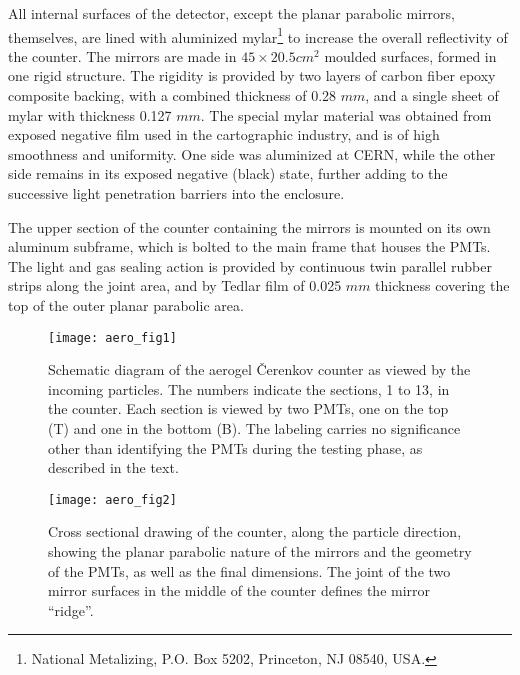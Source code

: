 All internal surfaces of the detector, except the planar parabolic mirrors,
themselves, are lined with aluminized 
mylar\footnote{National Metalizing, P.O. Box 5202, Princeton, NJ 08540, USA.} 
to increase the overall reflectivity of the counter.  
The mirrors are made in $45\times 20.5 cm^2$ moulded surfaces, formed in one 
rigid structure. 
The rigidity is provided by two layers of carbon fiber epoxy composite backing, 
with a combined thickness of 0.28 $mm$, and a single sheet of mylar with 
thickness 0.127 $mm$. 
The special mylar material was obtained from exposed negative film used in the
cartographic industry, and is of high smoothness and uniformity. One side was
aluminized at CERN, while the other side remains in its exposed negative
(black) state, further adding to the successive light penetration barriers into
the enclosure.  
 
The upper section of the counter containing the mirrors is mounted on its
own aluminum subframe, which is bolted to the main frame that houses the PMTs. 
The light and gas sealing action is provided by continuous twin parallel rubber
strips along the joint area, and by Tedlar film of 0.025 $mm$ thickness
covering the top of the outer planar parabolic area. 
%
\begin{figure}[p]
\texttt{[image: aero\_fig1]}
\caption[Aerogel:layout]{
 Schematic diagram of the aerogel \v{C}erenkov counter as viewed by the
 incoming particles.  The numbers indicate the sections, 1 to 13, in the
 counter. Each section is viewed by two PMTs, one on the top (T) and one in the
 bottom (B). The labeling carries no significance other than identifying the
 PMTs during the testing phase, as described in the text.
 }
\label{fig:aero_fig1}
\end{figure}

\begin{figure}[tbh]
\texttt{[image: aero\_fig2]}
\caption[Aerogel:mirrors]{
 Cross sectional drawing of the counter, along the particle direction, 
 showing the planar parabolic nature of the mirrors and the geometry of the 
 PMTs, as well as the final dimensions.  The joint of the two mirror surfaces in
 the middle of the counter defines the mirror ``ridge''.
 }
\label{fig:aero_fig2}
\end{figure}

